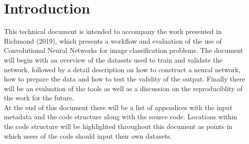 \chapter{Introduction}
This technical document is intended to accompany the work presented in Richmond (2019), which presents a workflow and evaluation of the use of Convolutional Neural Networks for image classification problems. The document will begin with an overview of the datasets used to train and validate the network, followed by a detail description on how to construct a neural network, how to prepare the data and how to test the validity of the output. Finally there will be an evaluation of the tools as well as a discussion on the reproduciblity of the work for the future.\\
\newline
At the end of this document there will be a list of appendices with the input metadata and the code structure along with the source code. Locations within the code structure will be highlighted throughout this document as points in which users of the code should input their own datasets. 

